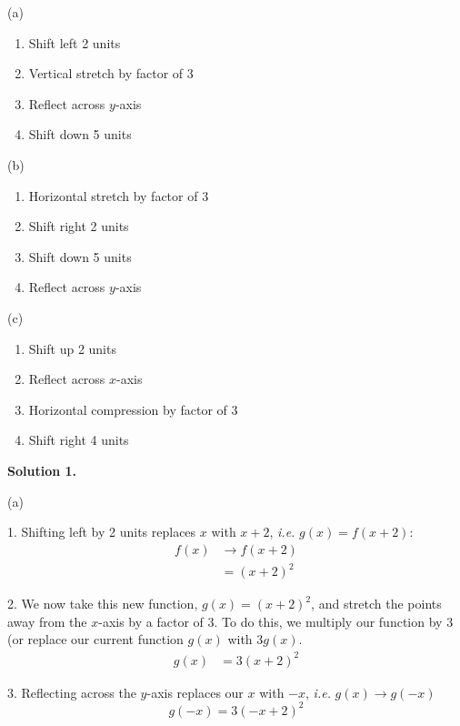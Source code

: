 \begin{minipage}{0.3\textwidth}
(a)
\begin{enumerate}
    \item Shift left 2 units
    \item Vertical stretch by factor of 3
    \item Reflect across $y$-axis
    \item Shift down 5 units
\end{enumerate}
\end{minipage}
\begin{minipage}{0.3\textwidth}
(b)
\begin{enumerate}
    \item Horizontal stretch by factor of 3
    \item Shift right 2 units
    \item Shift down 5 units
    \item Reflect across $y$-axis
\end{enumerate}
\end{minipage}
\begin{minipage}{0.3\textwidth}
(c)
\begin{enumerate}
    \item Shift up 2 units
    \item Reflect across $x$-axis
    \item Horizontal compression by factor of 3
    \item Shift right 4 units
\end{enumerate}
\end{minipage}
\bigskip 

{\color{blue}\textbf{Solution 1.}} \newline 

(a) \newline 

1. Shifting left by 2 units replaces $x$ with $x+2$, \textit{i.e.} $g(x) = f(x+2)$:
\begin{align*}
    f(x) &\rightarrow f(x+2) \\
    &= (x+2)^2
\end{align*}

2. We now take this new function, $g(x) = (x+2)^2$, and stretch the points away from the $x$-axis by a factor of 3. To do this, we multiply our function by 3 (or replace our current function $g(x)$ with $3g(x)$.
\begin{align*}
    g(x) &= 3(x+2)^2
\end{align*}

3. Reflecting across the $y$-axis replaces our $x$ with $-x$, \textit{i.e.} $g(x) \rightarrow g(-x)$
\[
g(-x) = 3(-x+2)^2
\]

